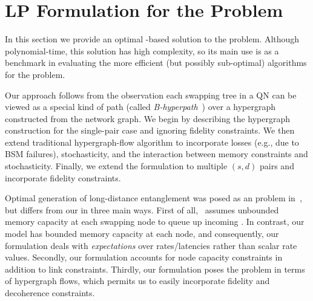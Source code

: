 \newcommand{\id}[1]{\ensuremath{\mathit{#1}}}
\newcommand{\ttohp}{\pi}

\section{LP Formulation for the \qnr Problem}
\label{sec:swapping_multiple-path}

In this section we provide an  optimal \LP-based solution to
the \qnr problem.  Although polynomial-time, this solution has high complexity, so its main use is as a benchmark in evaluating the more efficient (but possibly sub-optimal) algorithms for the problem.  

Our approach follows from the observation each
swapping tree in a QN can be viewed as a special kind of path (called
\emph{B-hyperpath}~\cite{Beckenbach2019}) over a hypergraph
constructed from the network graph.
%
We begin by describing the hypergraph construction for the
single-pair case and ignoring fidelity constraints. We then extend
traditional hypergraph-flow algorithm to incorporate losses
(e.g., due to BSM failures), stochasticity, and the interaction between 
memory constraints and stochasticity. Finally, we extend the formulation 
to multiple $(s,d)$ pairs and incorporate fidelity constraints.  

Optimal generation of long-distance entanglement was posed as an \LP
problem in~\cite{Daietal2020}, but differs from our  
in three main
ways. First of all,~\cite{Daietal2020} assumes unbounded memory capacity at each
swapping node to queue up incoming \epss. In contrast, our model
has bounded memory capacity at each node, and consequently, 
our \LP formulation deals with \textit{expectations} over
rates/latencies rather than scalar rate values. 
Secondly, our formulation accounts for node capacity constraints in addition to link constraints. 
Thirdly, our formulation poses the problem in terms of hypergraph flows, which permits us to easily incorporate fidelity and decoherence constraints. 

